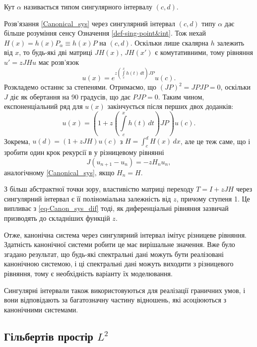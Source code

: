 \begin{definition}
	Кут $\alpha$ називається типом сингулярного інтервалу $(c,d)$.
\end{definition}


Розв'язання \eqref{Canonical_sys} через сингулярний інтервал $(c,d)$ типу $\alpha$ дає більше розуміння сенсу Означення \ref{def-sing-point&int}. Тож нехай $H(x)=h(x)P_\alpha \equiv h(x)P$ на $(c,d)$. Оскільки лише скалярна $h$ залежить від $x$, то будь-які дві матриці $JH(x)$, $JH(x')$ є комутативними, тому рівняння $u'=zJHu$ має розв'язок
\begin{equation*}
	u(x) = e^{z\left(\int\limits_c^x h(t)\,dt\right)JP}u(c).
\end{equation*}
Розкладемо останнє за степенями. Отримаємо, що $(JP)^2=JPJP=0$, оскільки $J$ діє як обертання на 90 градусів, що дає $PJP=0$. Таким чином, експоненціальний ряд для $u(x)$ закінчується після перших двох доданків:
\begin{equation*}
	u(x) = \left(1+z\left(\int\limits_c^x h(t)\,dt\right)JP\right)u(c).
\end{equation*}
Зокрема, $u(d)=(1+zJH)u(c)$ з $H=\int_c^d H(x)\,dx$, але це теж саме, що і зробити один крок рекурсії в у різницевому рівнянні
\begin{equation}\label{eq-Canon_sys_dif}
 	J(u_{n+1} - u_n) = -zH_nu_n,
\end{equation}
аналогічному \eqref{Canonical_sys}, якщо $H_n=H$.

З більш абстрактної точки зору, властивістю матриці переходу $T=I+zJH$ через сингулярний інтервал є її поліноміальна залежність від $z$, причому ступеня 1. Це випливає з \eqref{eq-Canon_sys_dif} тоді, як диференціальні рівняння зазвичай призводять до складніших функцій $z$.

Отже, канонічна система через сингулярний інтервал імітує різницеве рівняння. Здатність канонічної системи робити це має вирішальне значення. Вже було згадано результат, що будь-які спектральні дані можуть бути реалізовані канонічною системою, і ці спектральні дані можуть виходити з різницевого рівняння, тому є необхідність варіанту їх моделювання.

Сингулярні інтервали також використовуються для реалізації граничних умов, і вони відповідають за багатозначну частину відношень, які асоціюються з канонічними системами.

\subsection{Гільбертів простір $L^2$}

